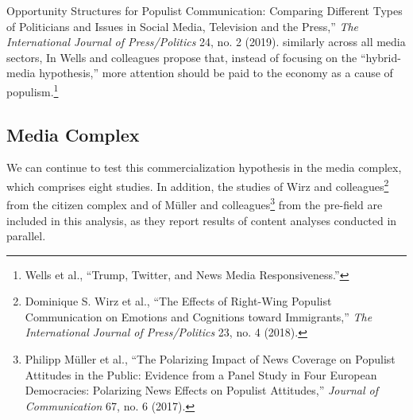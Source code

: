 \documentclass{tufte-handout}
\begin{document}
{{{  Opportunity Structures for Populist Communication: Comparing Different
  Types of Politicians and Issues in Social Media, Television and the
  Press,'' \emph{The International Journal of Press/Politics} 24, no. 2
  (2019).} similarly across all
media sectors, In Wells and colleagues propose that, instead of focusing on
the ``hybrid-media hypothesis,'' more attention should be paid to the
economy as a cause of populism.\footnote{Wells et al., ``Trump, Twitter,
  and News Media Responsiveness.''}

\hypertarget{media-complex}{%
\subsection{Media
Complex}\label{media-complex}}

We can continue to test this commercialization hypothesis in the media
complex, which comprises eight studies. In addition, the studies of Wirz
and colleagues\footnote{Dominique S. Wirz et al., ``The Effects of
  Right-Wing Populist Communication on Emotions and Cognitions toward
  Immigrants,'' \emph{The International Journal of Press/Politics} 23,
  no. 4 (2018).} from the citizen complex and of Müller and
colleagues\footnote{Philipp Müller et al., ``The Polarizing Impact of
  News Coverage on Populist Attitudes in the Public: Evidence from a
  Panel Study in Four European Democracies: Polarizing News Effects on
  Populist Attitudes,'' \emph{Journal of Communication} 67, no. 6
  (2017).} from the pre-field are included in this analysis, as they
report results of content analyses conducted in parallel.

}}
\end{document}
